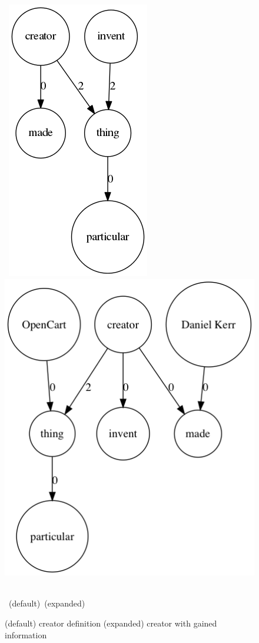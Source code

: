 \documentclass[twoside,b5paper,10pt]{article}
\begin{document}
\begin{figure}[htb]
  \vspace{3pt}
  \centerline{
  \hbox{
  \hspace{0.0in}
        \includegraphics[scale=0.5]{Figure/creator.png}
        \hspace{0.1\columnwidth}
        \includegraphics[scale=0.5]{Figure/creatornew.png}
    }
  }
  \vspace{3pt}
  \hbox{\hspace{0.13\columnwidth} (default) \hspace{0.3\columnwidth} (expanded)}
  \caption{ (default) creator definition (expanded) creator with gained information}
  \label{fig:creator}
\end{figure}
\end{document}

